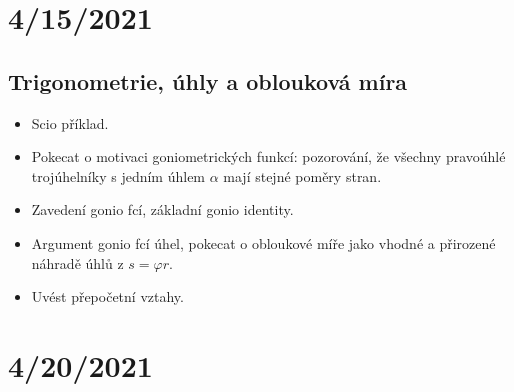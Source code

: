 \documentclass[11pt,a4paper]{article}
\begin{document}
    \section*{4/15/2021}
        
        \subsection*{Trigonometrie, úhly a oblouková míra}
        \begin{itemize}
            \item Scio příklad.
            \item Pokecat o motivaci goniometrických funkcí: pozorování, že všechny pravoúhlé trojúhelníky s jedním úhlem $\alpha$ mají stejné poměry stran.
            \item Zavedení gonio fcí, základní gonio identity.
            \item Argument gonio fcí úhel, pokecat o obloukové míře jako vhodné a přirozené náhradě úhlů z $s = \varphi r$.
            \item Uvést přepočetní vztahy.
        \end{itemize}

    \section*{4/20/2021}
\end{document}
